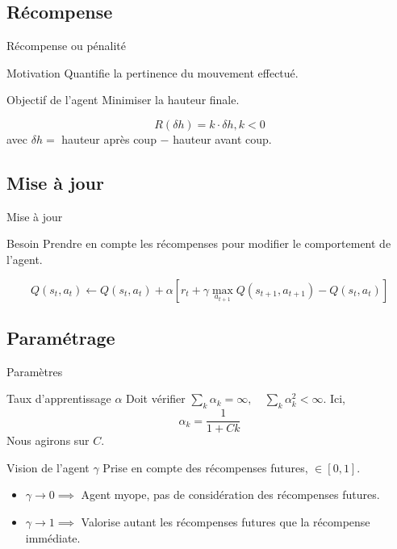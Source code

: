 \documentclass[tikz, footheight=2em]{beamer}
\begin{document}
\subsection{Récompense}
\begin{frame}[c]{Récompense ou pénalité}
  \begin{block}{Motivation}
    Quantifie la pertinence du mouvement effectué.
  \end{block}
  \pause{}
  \begin{block}{Objectif de l'agent}
    Minimiser la hauteur finale.
  \end{block}
  \pause{}
  \[ R(\delta h) = k \cdot \delta h, k < 0 \]
  avec \(\delta h =\) hauteur après coup \(-\) hauteur avant coup.
\end{frame}
\subsection{Mise à jour}
\begin{frame}[c]{Mise à jour}
  \begin{block}{Besoin}
    Prendre en compte les récompenses pour modifier le comportement de l'agent.
  \end{block}
  \pause{}
  \[
    Q(s_t, a_t) \leftarrow Q(s_t,a_t) + \alpha
    [r_t + \gamma \max_{a_{t+1}} Q(s_{t+1},a_{t+1}) - Q(s_t,a_t)]
  \]
\end{frame}

\subsection{Paramétrage}
\begin{frame}[c]{Paramètres}
  \begin{block}{Taux d'apprentissage \(\alpha\)}
    Doit vérifier \(\sum_{k} \alpha_k = \infty, \quad
    \sum_k \alpha_k^2 < \infty \).
    \pause{}
    Ici, \[ \alpha_k = \frac{1}{1 + Ck} \]
    Nous agirons sur \(C\).
  \end{block}
  \pause{}
  \begin{block}{Vision de l'agent \(\gamma\)}
    Prise en compte des récompenses futures, \(\in [0,1]\).
    \pause{}
    \begin{itemize}
      \item \(\gamma \to 0 \implies\) Agent myope, pas de considération des
        récompenses futures.
      \item \(\gamma \to 1 \implies\) Valorise autant les récompenses futures
        que la récompense immédiate.
    \end{itemize}
  \end{block}
\end{frame}
\end{document}
